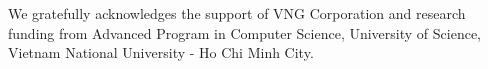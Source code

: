 %
%
%
%
%
%
%






\appendix
%
\begin{acks}
We gratefully acknowledges the support of VNG Corporation and research funding from Advanced Program in
Computer Science, University of Science, Vietnam National University - Ho Chi
Minh City. 
\end{acks}

